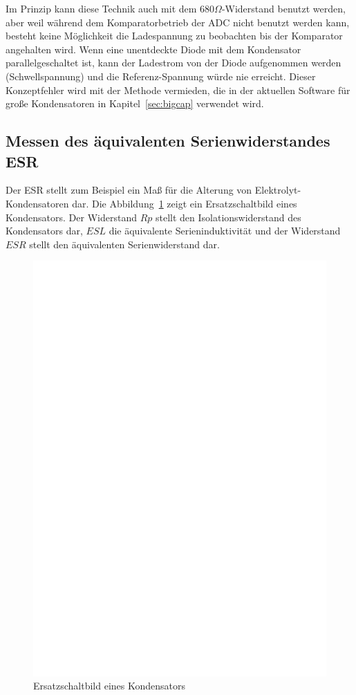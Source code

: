 Im Prinzip kann diese Technik auch mit dem \(680\Omega\)-Widerstand benutzt werden,
aber weil während dem Komparatorbetrieb der ADC nicht benutzt werden kann, besteht keine
Möglichkeit die Ladespannung zu beobachten bis der Komparator angehalten wird.
Wenn eine unentdeckte Diode mit dem Kondensator parallelgeschaltet ist, kann der Ladestrom
von der Diode aufgenommen werden (Schwellspannung) und die Referenz-Spannung würde nie erreicht.
Dieser Konzeptfehler wird mit der Methode vermieden, die in der aktuellen Software für große Kondensatoren in Kapitel~\ref{sec:bigcap}
verwendet wird.

\subsection{Messen des äquivalenten Serienwiderstandes ESR}
Der ESR \cite{ESR} stellt zum Beispiel ein Maß für die Alterung von Elektrolyt-Kondensatoren dar.
Die Abbildung~\ref{fig:Cap_equiv} zeigt ein Ersatzschaltbild eines Kondensators.
Der Widerstand \(Rp\) stellt den Isolationswiderstand des Kondensators dar, \(ESL\) die äquivalente
Serieninduktivität und der Widerstand \(ESR\) stellt den äquivalenten Serienwiderstand dar.

\begin{figure}[H]
  \centering
    \includegraphics[]{../FIG/Cap_equiv.eps}
  \caption{Ersatzschaltbild eines Kondensators}
  \label{fig:Cap_equiv}
\end{figure}

